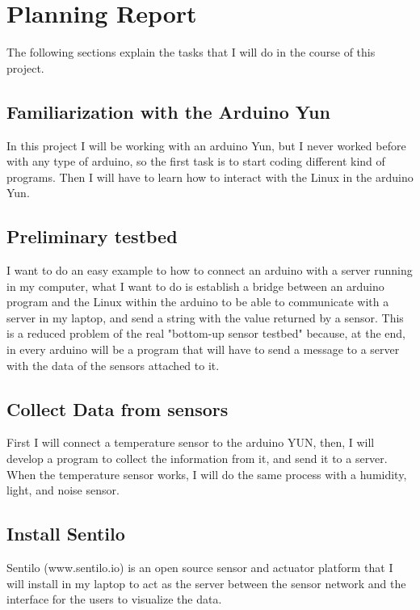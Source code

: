 \section{Planning Report}

The following sections explain the tasks that I will do in the course of this project.

\subsection{Familiarization with the Arduino Yun}

In this project I will be working with an arduino Yun, but I never worked before with any type of arduino, so the first task is to start coding different kind of programs. Then I will have to learn how to interact with the Linux in the arduino Yun.

\subsection{Preliminary testbed}

I want to do an easy example to how to connect an arduino with a server running in my computer, what I want to do is establish a bridge between an arduino program and the Linux within the arduino to be able to communicate with a server in my laptop, and send a string with the value returned by a sensor.
This is a reduced problem of the real "bottom-up sensor testbed" because, at the end, in every arduino will be a program that will have to send a message to a server with the data of the sensors attached to it.

\subsection{Collect Data from sensors}

First I will connect a temperature sensor to the arduino YUN, then, I will develop a program to collect the information from it, and send it to a server.
When the temperature sensor works, I will do the same process with a humidity, light, and noise sensor.

\subsection{Install Sentilo}

Sentilo (www.sentilo.io) is an open source sensor and actuator platform that I will install in my laptop to act as the server between the sensor network and the interface for the users to visualize the data. 

